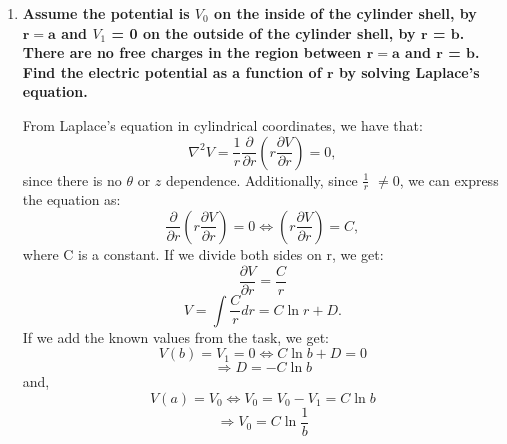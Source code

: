\documentclass[12pt]{article}
\begin{document}
\begin{enumerate}[leftmargin=\labelsep]
\begin{enumerate}
    \item \textbf{Assume the potential is $V_0$ on the inside of the cylinder shell, by $\mathbf{r} = \mathbf{a}$ and $V_1$ = 0 on the outside of the cylinder shell, by $\mathbf{r}$ = $\mathbf{b}$. There are no free charges in the region between $\mathbf{r} = \mathbf{a}$ and $\mathbf{r}$ = $\mathbf{b}$. Find the electric potential as a function of $\mathbf{r}$ by solving Laplace's equation.}

    From Laplace's equation in cylindrical coordinates, we have that:
    \begin{equation*}
        \nabla^{2}V =\frac{1}{r}\frac{\partial}{\partial r}(r\frac{\partial V}{\partial r}) = 0,
    \end{equation*}
    since there is no $\theta$ or $z$ dependence. Additionally, since $\frac{1}{r}$ $\neq 0$,
    we can express the equation as:
    \begin{equation*}
        \frac{\partial}{\partial r}(r\frac{\partial V}{\partial r}) = 0 \Leftrightarrow (r\frac{\partial V}{\partial r}) = C,
    \end{equation*}
    where C is a constant. If we divide both sides on r, we get:
    \begin{equation*}
        \frac{\partial V}{\partial r} = \frac{C}{r}
    \end{equation*}
    \begin{equation*}
        V = \int \! \frac{C}{r} dr = C \ln r + D.
    \end{equation*}
    If we add the known values from the task, we get:
    \begin{equation*}
        V(b) = V_1 = 0 \Leftrightarrow C\ln b + D = 0
    \end{equation*}
    \begin{equation*}
        \Rightarrow D = -C\ln b
    \end{equation*}
    and,
    \begin{equation*}
        V(a) = V_0 \Leftrightarrow V_0 = V_0 - V_1 = C\ln b
    \end{equation*}
    \begin{equation*}
        \Rightarrow V_0 = C\ln\frac{1}{b}
    \end{equation*}
    \end{enumerate}
    
\end{enumerate}
\end{document}

